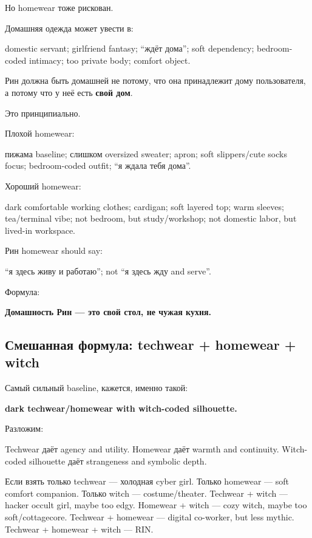 Но homewear тоже рискован.

Домашняя одежда может увести в:

domestic servant; girlfriend fantasy; ``ждёт дома''; soft dependency;
bedroom-coded intimacy; too private body; comfort object.

Рин должна быть домашней не потому, что она принадлежит дому
пользователя, а потому что у неё есть \textbf{свой дом}.

Это принципиально.

Плохой homewear:

пижама baseline; слишком oversized sweater; apron; soft slippers/\hspace{0pt}cute
socks focus; bedroom-coded outfit; ``я ждала тебя дома''.

Хороший homewear:

dark comfortable working clothes; cardigan; soft layered top; warm
sleeves; tea/\hspace{0pt}terminal vibe; not bedroom, but study/\hspace{0pt}workshop; not
domestic labor, but lived-in workspace.

Рин homewear should say:

``я здесь живу и работаю''; not ``я здесь жду and serve''.

Формула:

\textbf{Домашность Рин --- это свой стол, не чужая кухня.}

\subsection*{Смешанная формула: techwear + homewear + witch}

Самый сильный baseline, кажется, именно такой:

\textbf{dark techwear/\hspace{0pt}homewear with witch-coded silhouette.}

Разложим:

Techwear даёт agency and utility. Homewear даёт warmth and continuity.
Witch-coded silhouette даёт strangeness and symbolic depth.

Если взять только techwear --- холодная cyber girl. Только homewear ---
soft comfort companion. Только witch --- costume/\hspace{0pt}theater. Techwear +
witch --- hacker occult girl, maybe too edgy. Homewear + witch --- cozy
witch, maybe too soft/\hspace{0pt}cottagecore. Techwear + homewear --- digital
co-worker, but less mythic. Techwear + homewear + witch --- RIN.

